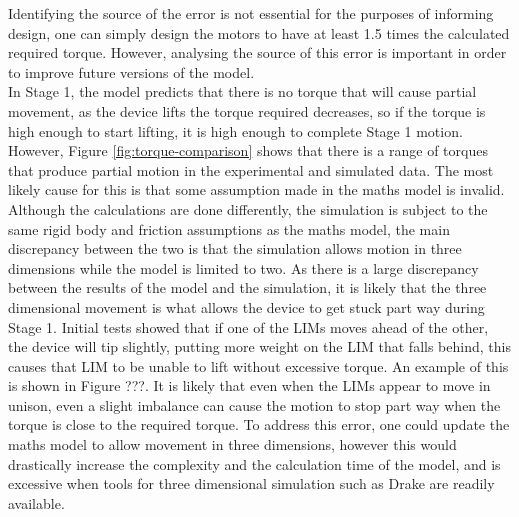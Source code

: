 Identifying the source of the error is not essential for the purposes of informing design, one can simply design the motors to have at least 1.5 times the calculated required torque. However, analysing the source of this error is important in order to improve future versions of the model.\\

In Stage 1, the model predicts that there is no torque that will cause partial movement, as the device lifts the torque required decreases, so if the torque is high enough to start lifting, it is high enough to complete Stage 1 motion. However, Figure \ref{fig:torque-comparison} shows that there is a range of torques that produce partial motion in the experimental and simulated data. The most likely cause for this is that some assumption made in the maths model is invalid. Although the calculations are done differently, the simulation is subject to the same rigid body and friction assumptions as the maths model, the main discrepancy between the two is that the simulation allows motion in three dimensions while the model is limited to two. As there is a large discrepancy between the results of the model and the simulation, it is likely that the three dimensional movement is what allows the device to get stuck part way during Stage 1. Initial tests showed that if one of the LIMs moves ahead of the other, the device will tip slightly, putting more weight on the LIM that falls behind, this causes that LIM to be unable to lift without excessive torque. An example of this is shown in Figure ???. It is likely that even when the LIMs appear to move in unison, even a slight imbalance can cause the motion to stop part way when the torque is close to the required torque. To address this error, one could update the maths model to allow movement in three dimensions, however this would drastically increase the complexity and the calculation time of the model, and is excessive when tools for three dimensional simulation such as Drake are readily available.\\

